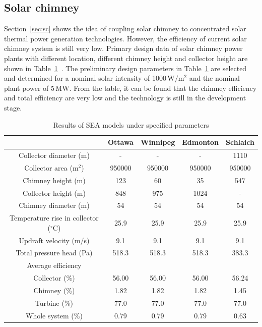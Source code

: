 \subsection{Solar chimney}

Section~\ref{sec:sc} shows the idea of coupling solar chimney to concentrated solar thermal power generation technologies.
However, the efficiency of current solar chimney system is still very low. Primary design data of solar chimney power plants with different location, different chimney height and collector height are shown in Table~\ref{tab:sc}~\cite{Bilgen2005}. The preliminary design parameters in Table~\ref{tab:sc} are selected and determined for a nominal solar intensity of 1000$\,\mathrm{W/m^2}$ and the nominal plant power of 5$\,\mathrm{MW}$. From the table, it can be found that the chimney efficiency and total efficiency are very low and the technology is still in the development stage.
\begin{table}[htbp]
	\caption{Results of SEA models under specified parameters}
	\begin{center}
	\begin{tabular}{ccccc}
		\toprule
		&Ottawa    &Winnipeg    &Edmonton    &Schlaich\\
		\midrule
		Collector diameter (m)    &-&-&-&1110 \\
  Collector area ($\mathrm{m^2}$)    & 950000    & 950000&950000&950000\\
  Chimney height (m)    &123    &60    &    35&    547\\
  Collector height (m)    &848    &975    &1024    &    -\\
  Chimney diameter (m)    &54    &54    &54    &54\\
  Temperature rise in collector ($\mathrm{^\circ C}$)    &25.9    &25.9    &25.9    &25.9\\
  Updraft velocity (m/s)&9.1    &9.1    &9.1    &9.1\\
  Total pressure head (Pa)&518.3    &518.3    &518.3    &383.3\\
  Average efficiency\\
  Collector (\%)    &56.00    &56.00    &56.00    &56.24\\
  Chimney (\%)    &1.82    &1.82    &1.82    &1.45\\
  Turbine (\%)    &77.0    &77.0    &77.0    &77.0\\
  Whole system (\%)    &0.79    &0.79    &0.79    &0.63\\
		\bottomrule
	\end{tabular}
	\end{center}
	\label{tab:sc}
\end{table}

